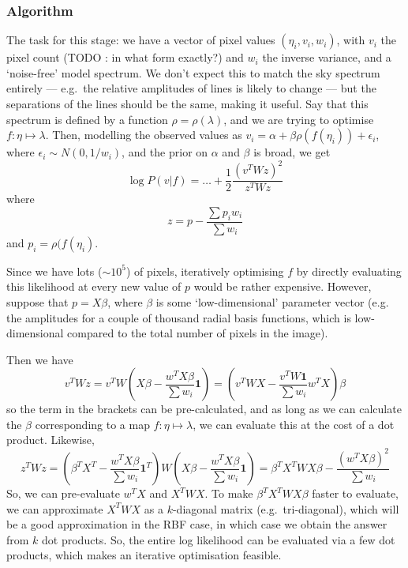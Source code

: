\subsubsection{Algorithm}

The task for this stage: we have a vector of pixel values
$(\eta_i, v_i, w_i)$, with $v_i$ the pixel count (TODO : in what
form exactly?) and $w_i$ the inverse variance, and a `noise-free'
model spectrum. We don't expect this to match the sky spectrum entirely
--- e.g.\ the relative amplitudes of lines is likely to change --- but the
separations of the lines should be the same, making it useful.
Say that this spectrum is defined by a function $\rho = \rho(\lambda)$,
and we are trying to optimise $f : \eta \mapsto \lambda$.
Then, modelling the observed values as $v_i = \alpha + \beta \rho (f
(\eta_i)) + \epsilon_i$, where $\epsilon_i \sim N(0,1/w_i)$, and the
prior on $\alpha$ and $\beta$ is broad, we get
\[
\log P(v|f) = \dots + \frac{1}{2} \frac{(v^T W z)^2}{z^T W z}
\]
where
\[
z = p - \frac{\sum p_i w_i}{\sum w_i}
\]
and $p_i = \rho (f (\eta_i)$.

Since we have lots ($\sim 10^5$) of pixels, iteratively optimising $f$
by directly evaluating this likelihood at every new value of $p$ would
be rather expensive. However, suppose that $p = X \beta$, where $\beta$
is some `low-dimensional' parameter vector (e.g. the amplitudes for a
couple of thousand radial basis functions, which is low-dimensional
compared to the total number of pixels in the image).

Then we have
\[
v^T W z = v^T W \left(X \beta - \frac{w^T X \beta}{\sum w_i}\mathbf{1}\right)
= \left(v^T W X - \frac{v^T W \mathbf{1}}{\sum w_i} w^T X\right) \beta
\]
so the term in the brackets can be pre-calculated, and as long as we can
calculate the $\beta$ corresponding to a map $f : \eta \mapsto \lambda$,
we can evaluate this at the cost of a dot product. Likewise,
\[
z^T W z = \left(\beta^T X^T - \frac{w^T X \beta}{\sum w_i} \mathbf{1}^T\right)
W \left(X \beta - \frac{w^T X \beta}{\sum w_i} \mathbf{1}\right)
= \beta^T X^T W X \beta - \frac{(w^T X \beta)^2}{\sum w_i}
\] 
So, we can pre-evaluate $w^T X$ and $X^T W X$. To make $\beta^T X^T W X \beta$
faster to evaluate, we can approximate $X^T W X$ as a $k$-diagonal matrix
(e.g.\ tri-diagonal), which will be a good approximation in the RBF case, in which
case we obtain the answer from $k$ dot products. So, the entire log
likelihood can be evaluated via a few dot products, which makes an iterative
optimisation feasible.

